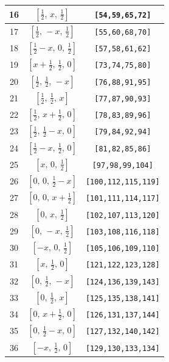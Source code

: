 \documentclass[fleqn,8pt]{jsarticle}
\begin{document}
\begin{longtable}{ccc}
16 & $\left[ \frac{1}{2},\, x,\, \frac{1}{2} \right]$ & {\tt [54,59,65,72]} \\ \hline
17 & $\left[ \frac{1}{2},\, - x,\, \frac{1}{2} \right]$ & {\tt [55,60,68,70]} \\ \hline
18 & $\left[ \frac{1}{2} - x,\, 0,\, \frac{1}{2} \right]$ & {\tt [57,58,61,62]} \\ \hline
19 & $\left[ x + \frac{1}{2},\, \frac{1}{2},\, 0 \right]$ & {\tt [73,74,75,80]} \\ \hline
20 & $\left[ \frac{1}{2},\, \frac{1}{2},\, - x \right]$ & {\tt [76,88,91,95]} \\ \hline
21 & $\left[ \frac{1}{2},\, \frac{1}{2},\, x \right]$ & {\tt [77,87,90,93]} \\ \hline
22 & $\left[ \frac{1}{2},\, x + \frac{1}{2},\, 0 \right]$ & {\tt [78,83,89,96]} \\ \hline
23 & $\left[ \frac{1}{2},\, \frac{1}{2} - x,\, 0 \right]$ & {\tt [79,84,92,94]} \\ \hline
24 & $\left[ \frac{1}{2} - x,\, \frac{1}{2},\, 0 \right]$ & {\tt [81,82,85,86]} \\ \hline
25 & $\left[ x,\, 0,\, \frac{1}{2} \right]$ & {\tt [97,98,99,104]} \\ \hline
26 & $\left[ 0,\, 0,\, \frac{1}{2} - x \right]$ & {\tt [100,112,115,119]} \\ \hline
27 & $\left[ 0,\, 0,\, x + \frac{1}{2} \right]$ & {\tt [101,111,114,117]} \\ \hline
28 & $\left[ 0,\, x,\, \frac{1}{2} \right]$ & {\tt [102,107,113,120]} \\ \hline
29 & $\left[ 0,\, - x,\, \frac{1}{2} \right]$ & {\tt [103,108,116,118]} \\ \hline
30 & $\left[ - x,\, 0,\, \frac{1}{2} \right]$ & {\tt [105,106,109,110]} \\ \hline
31 & $\left[ x,\, \frac{1}{2},\, 0 \right]$ & {\tt [121,122,123,128]} \\ \hline
32 & $\left[ 0,\, \frac{1}{2},\, - x \right]$ & {\tt [124,136,139,143]} \\ \hline
33 & $\left[ 0,\, \frac{1}{2},\, x \right]$ & {\tt [125,135,138,141]} \\ \hline
34 & $\left[ 0,\, x + \frac{1}{2},\, 0 \right]$ & {\tt [126,131,137,144]} \\ \hline
35 & $\left[ 0,\, \frac{1}{2} - x,\, 0 \right]$ & {\tt [127,132,140,142]} \\ \hline
36 & $\left[ - x,\, \frac{1}{2},\, 0 \right]$ & {\tt [129,130,133,134]} \\ \hline

\end{longtable}
\end{document}
